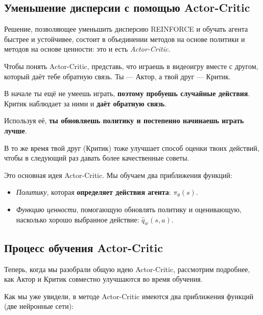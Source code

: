 \documentclass[11pt,a4paper]{article}
\begin{document}
\subsection{Уменьшение дисперсии с помощью Actor-Critic}\label{reducing-variance-with-actor-critic-methods}

Решение, позволяющее уменьшить дисперсию REINFORCE и обучать агента быстрее и устойчивее, состоит в объединении методов на основе политики и методов на основе ценности: это и есть \emph{Actor-Critic}.

Чтобы понять Actor-Critic, представь, что играешь в видеоигру вместе с другом, который даёт тебе обратную связь. Ты --- Актор, а твой друг --- Критик.


В начале ты ещё не умеешь играть, \textbf{поэтому пробуешь случайные действия}. Критик наблюдает за ними и \textbf{даёт обратную связь}.

Используя её, \textbf{ты обновляешь политику и постепенно начинаешь играть лучше}.

В то же время твой друг (Критик) тоже улучшает способ оценки твоих действий, чтобы в следующий раз давать более качественные советы.

Это основная идея Actor-Critic. Мы обучаем два приближения функций:

\begin{itemize}
\item
  \emph{Политику}, которая \textbf{определяет действия агента}: \(\pi_{\theta}(s)\).
\item
  \emph{Функцию ценности}, помогающую обновлять политику и оценивающую, насколько хорошо выбранное действие: \(\hat{q}_{w}(s,a)\).
\end{itemize}

\subsection{Процесс обучения Actor-Critic}\label{the-actor-critic-process}

Теперь, когда мы разобрали общую идею Actor-Critic, рассмотрим подробнее, как Актор и Критик совместно улучшаются во время обучения.

Как мы уже увидели, в методе Actor-Critic имеются два приближения функций (две нейронные сети):
\end{document}
